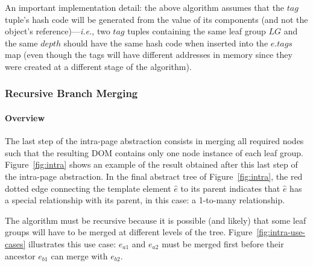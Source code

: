 An important implementation detail: the above algorithm assumes that the $tag$ tuple's hash code will be generated from the value of its components (and not the object's reference)---\emph{i.e.}, two $tag$ tuples containing the same leaf group $LG$ and the same $depth$ should have the same hash code when inserted into the $e.tags$ map (even though the tags will have different addresses in memory since they were created at a different stage of the algorithm).

\subsubsection{Recursive Branch Merging}
\paragraph{Overview}\label{appstract:sec:overview}
The last step of the intra-page abstraction consists in merging all required nodes such that the resulting DOM contains only one node instance of each leaf group. 
Figure~\ref{fig:intra} shows an example of the result obtained after this last step of the intra-page abstraction. 
In the final abstract tree of Figure~\ref{fig:intra}, the red dotted edge connecting the template element $\hat{e}$ to its parent indicates that $\hat{e}$ has a special relationship with its parent, in this case: a 1-to-many relationship.

The algorithm must be recursive because it is possible (and likely) that some leaf groups will have to be merged at different levels of the tree. 
Figure~\ref{fig:intra-use-cases} illustrates this use case: $e_{a1}$ and $e_{a2}$ must be merged first before their ancestor $e_{b1}$ can merge with $e_{b2}$.

